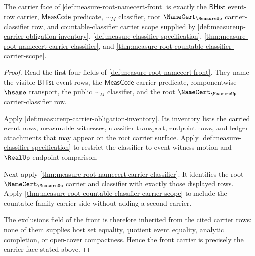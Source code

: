 \begin{theorem}
\label{thm:measure-root-namecert-front-carrier}
The carrier face of \autoref{def:measure-root-namecert-front} is exactly the
$\mathsf{BHist}$ event-row carrier, $\mathsf{MeasCode}$ predicate,
$\sim_M$ classifier, root $\NameCert_{\MeasureUp}$ carrier-classifier row,
and countable-classifier carrier scope supplied by
\autoref{def:measureup-carrier-obligation-inventory},
\autoref{def:measure-classifier-specification},
\autoref{thm:measure-root-namecert-carrier-classifier}, and
\autoref{thm:measure-root-countable-classifier-carrier-scope}.
\end{theorem}
\begin{proof}
Read the first four fields of
\autoref{def:measure-root-namecert-front}. They name the visible
$\mathsf{BHist}$ event rows, the $\mathsf{MeasCode}$ carrier predicate,
componentwise $\hsame$ transport, the public $\sim_M$ classifier, and the
root $\NameCert_{\MeasureUp}$ carrier-classifier row.

Apply \autoref{def:measureup-carrier-obligation-inventory}. Its inventory
lists the carried event rows, measurable witnesses, classifier transport,
endpoint rows, and ledger attachments that may appear on the root carrier
surface. Apply \autoref{def:measure-classifier-specification} to restrict
the classifier to event-witness motion and $\RealUp$ endpoint comparison.

Next apply \autoref{thm:measure-root-namecert-carrier-classifier}. It
identifies the root $\NameCert_{\MeasureUp}$ carrier and classifier with
exactly those displayed rows. Apply
\autoref{thm:measure-root-countable-classifier-carrier-scope} to include the
countable-family carrier side without adding a second carrier.

The exclusions field of the front is therefore inherited from the cited
carrier rows: none of them supplies host set equality, quotient event
equality, analytic completion, or open-cover compactness. Hence the front
carrier is precisely the carrier face stated above.
\end{proof}

